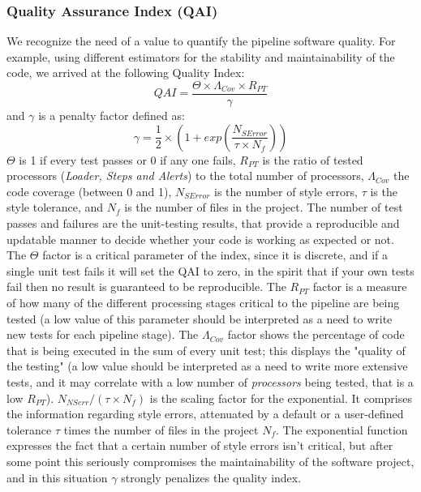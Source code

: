 \documentclass[final,5p,times,twocolumn,authoryear]{elsarticle}
\begin{document}
\subsubsection{Quality Assurance Index (QAI)}
We recognize the need of a value to quantify the pipeline software quality.
For example, using different estimators for the stability and maintainability of the code, we
arrived at the following Quality Index:
%
\begin{displaymath}
QAI = \frac{ \Theta \times \Lambda_{Cov} \times R_{PT}}{\gamma}
\end{displaymath}
%
and $\gamma$ is a penalty factor defined as:
%
\begin{displaymath}
\gamma = \frac{1}{2} \times \left( 1 + exp \left( \frac{N_{SError}}{\tau \times N_f} \right)\right)
\end{displaymath}
%
$\Theta$ is 1 if every test passes or 0 if any one fails,
$R_{PT}$ is the ratio of tested processors (\textit{Loader, Steps and Alerts})
to the total number of processors, $\Lambda_{Cov}$ the code coverage (between 0 and 1),
$N_{SError}$ is the number of style errors, $\tau$ is the style tolerance,
and $N_f$ is the number of files in the project.
%
The number of test passes and failures are the unit-testing results,
that provide a reproducible and upda\-table manner
to decide whether your code is working as expected or not.
%
The $\Theta$ factor is a critical parameter of the index, since it is discrete,
and if a single unit test fails it will set the QAI to zero, in the spirit that if
your own tests fail then no result is guaranteed to be reproducible.
%
The $R_{PT}$ factor is a measure of how many of the different processing stages critical to the pipeline
are being tested (a low value of this parameter should be interpreted as a need to
write new tests for each pipeline stage).
%
The $\Lambda_{Cov}$ factor shows the percentage of code that
is being executed in the sum of every unit test;
this displays the "quality of the testing" (a low value should be interpreted
as a need to write more extensive tests, \textcolor{blue!95}{and it may 
correlate with a low number of \textit{processors} being tested, 
that is a low $R_{PT}$}).
%
$N_{NSerr}/(\tau \times N_f)$ is the scaling factor for the exponential.
It comprises the information regarding style errors, attenuated
by a default or a user-defined tolerance $\tau$ times the number
of files in the project $N_f$. 
\textcolor{blue!95}{
The exponential function expresses the fact that a certain number of 
style errors isn't critical, but after some point this seriously compromises
the maintainability of the software project, and in this situation 
$\gamma$ strongly penalizes the quality index.}
\end{document}
